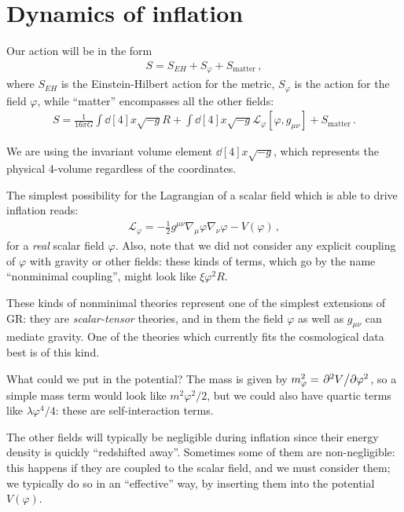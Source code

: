 \documentclass[main.tex]{subfiles}
\begin{document}
\section{Dynamics of inflation}


Our action will be in the form 
%
\begin{align}
S = S_{EH} + S_\varphi + S _{\text{matter}}
\,,
\end{align}
%
where \(S_{EH}\) is the Einstein-Hilbert action for the metric, \(S_\varphi \) is the action for the field \(\varphi \), while ``matter'' encompasses all the other fields:
%
\begin{align}
S = \frac{1}{16 \pi G} \int \dd[4]{x} \sqrt{-g} R 
+ \int \dd[4]{x} \sqrt{-g} \mathscr{L}_\varphi [\varphi , g_{\mu \nu }]
+ S _{\text{matter}}
\,.
\end{align}

We are using the invariant volume element \(\dd[4]{x} \sqrt{-g}\), which represents the physical 4-volume regardless of the coordinates.

The simplest possibility for the Lagrangian of a scalar field which is able to drive inflation reads: 
%
\begin{align}
\mathscr{L}_{\varphi } = -\frac{1}{2} g^{\mu \nu } \nabla_{\mu } \varphi \nabla_{\nu } \varphi  - V(\varphi )
\,,
\end{align}
%
for a \emph{real} scalar field \(\varphi \).
Also, note that we did not consider any explicit coupling of \(\varphi \) with gravity or other fields: these kinds of terms, which go by the name ``nonminimal coupling'', might look like \(\xi \varphi^2 R\).

These kinds of nonminimal theories represent one of the simplest extensions of GR: they are \emph{scalar-tensor} theories, and in them the field \(\varphi \) as well as \(g_{\mu \nu }\) can mediate gravity. 
One of the theories which currently fits the cosmological data best is of this kind. 

What could we put in the potential? The mass is given by \(m_\varphi^2 = \pdv*[2]{V}{\varphi }\), so a simple mass term would look like \(m^2 \varphi^2 / 2\), but we could also have quartic terms like \(\lambda \varphi^{4} / 4\): these are self-interaction terms. 

The other fields will typically be negligible during inflation since their energy density is quickly ``redshifted away''. 
Sometimes some of them are non-negligible: this happens if they are coupled to the scalar field, and we must consider them; we typically do so in an ``effective'' way, by inserting them into the potential \(V(\varphi )\). 
\end{document}
